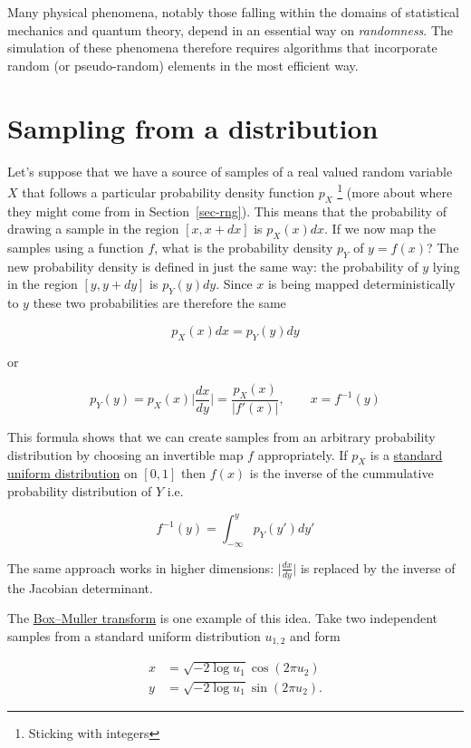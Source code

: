 \documentclass[
  letterpaper,
  DIV=11,
  numbers=noendperiod]{scrreprt}
\theoremstyle{definition}
\theoremstyle{remark}
\begin{document}
Many physical phenomena, notably those falling within the domains of
statistical mechanics and quantum theory, depend in an essential way on
\emph{randomness}. The simulation of these phenomena therefore requires
algorithms that incorporate random (or pseudo-random) elements in the
most efficient way.

\hypertarget{sampling-from-a-distribution}{%
\section{Sampling from a
distribution}\label{sampling-from-a-distribution}}

Let's suppose that we have a source of samples of a real valued random
variable \(X\) that follows a particular probability density function
\(p_X\) \footnote{Sticking with integers} (more about where they might
come from in Section~\ref{sec-rng}). This means that the probability of
drawing a sample in the region \([x, x+dx]\) is \(p_X(x)dx\). If we now
map the samples using a function \(f\), what is the probability density
\(p_Y\) of \(y=f(x)\)? The new probability density is defined in just
the same way: the probability of \(y\) lying in the region \([y, y+dy]\)
is \(p_Y(y)dy\). Since \(x\) is being mapped deterministically to \(y\)
these two probabilities are therefore the same

\[
p_X(x)dx = p_Y(y)dy
\]

or

\[
p_Y(y)=p_X(x)\Bigg\lvert \frac{dx}{dy}\Bigg\rvert= \frac{p_X(x)}{|f'(x)|},\qquad x=f^{-1}(y)
\]

This formula shows that we can create samples from an arbitrary
probability distribution by choosing an invertible map \(f\)
appropriately. If \(p_X\) is a
\href{https://en.wikipedia.org/wiki/Continuous_uniform_distribution}{standard
uniform distribution} on \([0,1]\) then \(f(x)\) is the inverse of the
cummulative probability distribution of \(Y\) i.e.

\[
f^{-1}(y) = \int^y_{-\infty} p_Y(y')dy'
\]

The same approach works in higher dimensions:
\(\big\lvert \frac{dx}{dy}\big\rvert\) is replaced by the inverse of the
Jacobian determinant.

The
\href{https://en.wikipedia.org/wiki/Box\%E2\%80\%93Muller_transform}{Box--Muller
transform} is one example of this idea. Take two independent samples
from a standard uniform distribution \(u_{1,2}\) and form

\[
\begin{align}
x &= \sqrt{-2\log u_1}\cos(2\pi u_2)\\
y &= \sqrt{-2\log u_1}\sin(2\pi u_2).
\end{align}
\]
\end{document}
